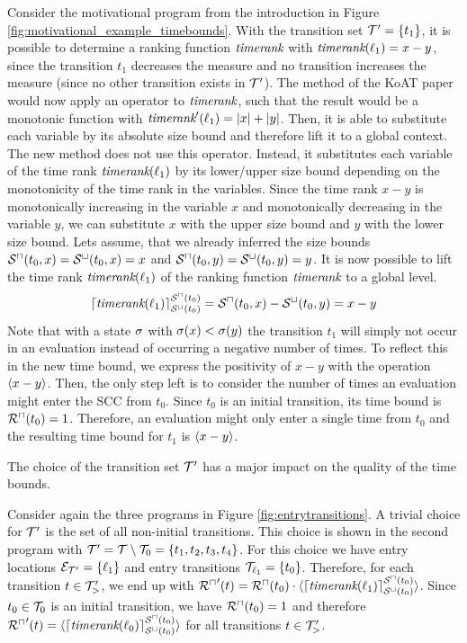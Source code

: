 \begin{example}
  
  Consider the motivational program from the introduction in Figure \ref{fig:motivational_example_timebounds}.
  With the transition set $\mathcal{T}' = \lbrace t_1 \rbrace$, it is possible to determine a ranking function $\emph{timerank}$ with $\emph{timerank}(\ell_1) = x - y$, since the transition $t_1$ decreases the measure and no transition increases the measure (since no other transition exists in $\mathcal{T}'$).
  The method of the KoAT paper \cite{koat} would now apply an operator to $\emph{timerank}$, such that the result would be a monotonic function with $\emph{timerank}'(\ell_1) = \left|x\right| + \left|y\right|$.
  Then, it is able to substitute each variable by its absolute size bound and therefore lift it to a global context.
  The new method does not use this operator.
  Instead, it substitutes each variable of the time rank $\emph{timerank}(\ell_1)$ by its lower/upper size bound depending on the monotonicity of the time rank in the variables.
  Since the time rank $x-y$ is monotonically increasing in the variable $x$ and monotonically decreasing in the variable $y$, we can substitute $x$ with the upper size bound and $y$ with the lower size bound.
  Lets assume, that we already inferred the size bounds ${\mathcal{S}^\sqcap}(t_0,x) = {\mathcal{S}^\sqcup}(t_0,x) = x$ and ${\mathcal{S}^\sqcap}(t_0,y) = {\mathcal{S}^\sqcup}(t_0,y) = y$.
  It is now possible to lift the time rank $\emph{timerank}(\ell_1)$ of the ranking function $\emph{timerank}$ to a global level.
  \[ \lceil \emph{timerank}(\ell_1) \rceil^{{\mathcal{S}^\sqcap}(t_0)}_{{\mathcal{S}^\sqcup}(t_0)} = {\mathcal{S}^\sqcap}(t_0, x) - {\mathcal{S}^\sqcup}(t_0, y) = x - y \]
  Note that with a state $\sigma$ with $\sigma(x) < \sigma(y)$ the transition $t_1$ will simply not occur in an evaluation instead of occurring a negative number of times.
  To reflect this in the new time bound, we express the positivity of $x - y$ with the operation $\langle x - y\rangle$.
  Then, the only step left is to consider the number of times an evaluation might enter the SCC from $t_0$.
  Since $t_0$ is an initial transition, its time bound is ${\mathcal{R}^\sqcap}(t_0) = 1$.
  Therefore, an evaluation might only enter a single time from $t_0$ and the resulting time bound for $t_1$ is $\langle x - y\rangle$.
\end{example}

The choice of the transition set $\mathcal{T}'$ has a major impact on the quality of the time bounds.

Consider again the three programs in Figure \ref{fig:entrytransitions}.
A trivial choice for $\mathcal{T}'$ is the set of all non-initial transitions.
This choice is shown in the second program with $\mathcal{T}' = \mathcal{T} \setminus \mathcal{T}_0 = \lbrace t_1, t_2, t_3, t_4 \rbrace$.
For this choice we have entry locations $\mathcal{E}_{\mathcal{T}'} = \lbrace \ell_1 \rbrace$ and entry transitions $\mathcal{T}_{\ell_1} = \lbrace t_0 \rbrace$.
Therefore, for each transition $t \in \mathcal{T}'_>$, we end up with ${\mathcal{R}^\sqcap}'(t) = {\mathcal{R}^\sqcap}(t_0) \cdot \langle\lceil \emph{timerank}(\ell_1) \rceil^{{\mathcal{S}^\sqcap}(t_0)}_{{\mathcal{S}^\sqcup}(t_0)}\rangle$.
Since $t_0 \in \mathcal{T}_0$ is an initial transition, we have ${\mathcal{R}^\sqcap}(t_0) = 1$ and therefore ${\mathcal{R}^\sqcap}'(t) = \langle\lceil \emph{timerank}(\ell_0) \rceil^{{\mathcal{S}^\sqcap}(t_0)}_{{\mathcal{S}^\sqcup}(t_0)}\rangle$ for all transitions $t \in \mathcal{T}'_>$.

